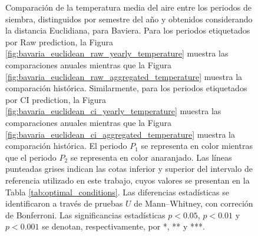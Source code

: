 \begin{figure}[htbp]
	\caption{
		Comparación de la temperatura media del aire entre los periodos de siembra, distinguidos por semestre del año y obtenidos considerando la distancia Euclidiana, para Baviera. Para los periodos etiquetados por Raw prediction, la Figura \ref{fig:bavaria_euclidean_raw_yearly_temperature} muestra las comparaciones anuales mientras que la Figura \ref{fig:bavaria_euclidean_raw_aggregated_temperature} muestra la comparación histórica. Similarmente, para los periodos etiquetados por CI prediction, la Figura \ref{fig:bavaria_euclidean_ci_yearly_temperature} muestra las comparaciones anuales mientras que la Figura \ref{fig:bavaria_euclidean_ci_aggregated_temperature} muestra la comparación histórica. El periodo $P_1$ se representa en color mientras que el periodo $P_2$ se representa en color anaranjado. Las líneas punteadas grises indican las cotas inferior y superior del intervalo de referencia utilizado en este trabajo, cuyos valores se presentan en la Tabla \ref{tab:optimal_conditions}. Las diferencias estadísticas se identificaron a través de pruebas $U$ de Mann--Whitney, con correción de Bonferroni. Las significancias estadísticas $p<0.05$, $p<0.01$ y $p<0.001$ se denotan, respectivamente, por *, ** y ***.
	}
	\label{fig:bavaria_euclidean_average_temperature}
	
	
\end{figure}



